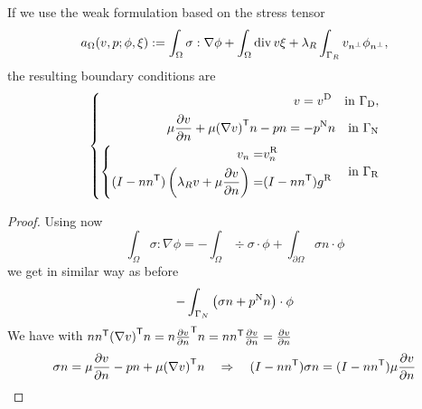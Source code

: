 \begin{proposition}\label{prop:}
If we use the weak formulation based on the stress tensor
%
\begin{equation}\label{eq:}
a_{\Omega}(v,p; \phi,\xi) := \int_{\Omega} \sigma:\nabla\phi + \int_{\Omega} \operatorname{div} v \xi
+ \lambda_R\int_{\Gamma_R}v_{{n^{\perp}}} \phi_{{n^{\perp}}},
\end{equation}
%
the resulting boundary conditions are 
%
\begin{equation}\label{eq:stokes:bccauchy}
%
\left\{
\begin{aligned}
v = \vD \quad \mbox{in $\GammaD$},\\
\mu\frac{\partial v}{\partial n} + \mu \transpose{(\nabla v)} n- p n = -\pN n\quad \mbox{in $\GammaN$}\\
%
\left\{
\begin{aligned}
v_n =& \vn\\
(I-n\transpose{n}) \left( \lambda_R v + \mu \frac{\partial v}{\partial n}\right)  =& (I-n\transpose{n})\gR 
\end{aligned}
\right.
%
\quad \mbox{in $\GammaR$}
\end{aligned}
\right.
%
\end{equation}
%
\end{proposition}
%
\begin{proof}
Using now
%
%
\begin{equation}\label{eq:Stokes:ippsigma}
\int_{\Omega} \sigma:\nabla\phi = -\int_{\Omega} \div \sigma\cdot \phi+ \int_{\partial \Omega} \sigma n\cdot \phi
\end{equation}
%
we get in similar way as before
%
\begin{align*}
-\int_{\Gamma_N} \left( \sigma n + p^{\rm N} n \right)\cdot\phi 
\end{align*}
%
We have with $n{n}^{\mathsf{T}}{(\nabla v)}^{\mathsf{T}} n = n{\frac{\partial v}{\partial n}}^{\mathsf{T}}n= n{n}^{\mathsf{T}}\frac{\partial v}{\partial n}=\frac{\partial v}{\partial n}$
%
\begin{align*}
\sigma n = \mu\frac{\partial v}{\partial n} - p n + \mu {(\nabla v)}^{\mathsf{T}} n
\quad\Rightarrow\quad (I-n{n}^{\mathsf{T}})\sigma n = (I-n{n}^{\mathsf{T}})\mu\frac{\partial v}{\partial n}
\end{align*}
%

\end{proof}
%
%
